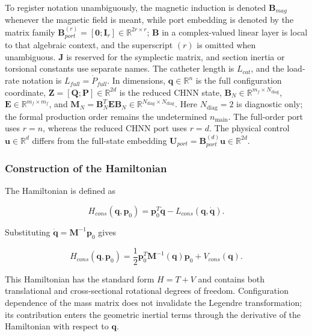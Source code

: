 To register notation unambiguously, the magnetic induction is denoted \(\mathbf{B}_{mag}\) whenever the magnetic field is meant, while port embedding is denoted by the matrix family \(\mathbf{B}_{port}^{(r)}=[\mathbf{0};\mathbf{I}_{r}]\in\mathbb{R}^{2r\times r}\); \(\mathbf{B}\) in a complex-valued linear layer is local to that algebraic context, and the superscript \((r)\) is omitted when unambiguous. \(\mathbf{J}\) is reserved for the symplectic matrix, and section inertia or torsional constants use separate names. The catheter length is \(L_{cat}\), and the load-rate notation is \(L_{full}=\dot P_{full}\). In dimensions, \(\mathbf{q}\in\mathbb{R}^{n}\) is the full configuration coordinate, \(\mathbf{Z}=[\mathbf{Q};\mathbf{P}]\in\mathbb{R}^{2d}\) is the reduced CHNN state, \(\mathbf{B}_{N}\in\mathbb{R}^{m_f\times N_{\mathrm{diag}}}\), \(\mathbf{E}\in\mathbb{R}^{m_f\times m_f}\), and \(\mathbf{M}_{N}=\mathbf{B}_{N}^{T}\mathbf{E}\mathbf{B}_{N}\in\mathbb{R}^{N_{\mathrm{diag}}\times N_{\mathrm{diag}}}\). Here \(N_{\mathrm{diag}}=2\) is diagnostic only; the formal production order remains the undetermined \(n_{\mathrm{main}}\). The full-order port uses \(r=n\), whereas the reduced CHNN port uses \(r=d\). The physical control \(\mathbf{u}\in\mathbb{R}^{d}\) differs from the full-state embedding \(\mathbf{U}_{port}=\mathbf{B}_{port}^{(d)}\mathbf{u}\in\mathbb{R}^{2d}\).

\subsubsection{Construction of the Hamiltonian}\label{sec:hamiltonian-3-2-4}

The Hamiltonian is defined as

\begin{equation}
\label{eq:hamiltonian-3-13}
H_{cons}\left( \mathbf{q},\mathbf{p}_{0} \right) = \mathbf{p}_{0}^{T}\dot{\mathbf{q}} - L_{cons}\left( \mathbf{q},\dot{\mathbf{q}} \right).
\end{equation}

Substituting \(\dot{\mathbf{q}} = \mathbf{M}^{-1}\mathbf{p}_{0}\) gives

\begin{equation}
\label{eq:hamiltonian-3-14}
\boxed{H_{cons}\left( \mathbf{q},\mathbf{p}_{0} \right) = \frac{1}{2}\mathbf{p}_{0}^{T}\mathbf{M}^{- 1}\left( \mathbf{q} \right)\mathbf{p}_{0} + V_{cons}\left( \mathbf{q} \right).}
\end{equation}

This Hamiltonian has the standard form \(H=T+V\) and contains both translational and cross-sectional rotational degrees of freedom. Configuration dependence of the mass matrix does not invalidate the Legendre transformation; its contribution enters the geometric inertial terms through the derivative of the Hamiltonian with respect to \(\mathbf{q}\).

